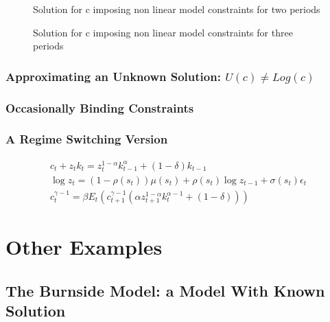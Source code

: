 \documentclass[12pt]{article}
\begin{document}
\begin{figure}
  \centering
 \caption{Solution for c imposing non linear model constraints for two periods}
  \caption{Solution for c imposing non linear model constraints for three periods}
  \label{fig:cfuncsecond}
\end{figure}

\subsubsection{Approximating an Unknown Solution: $U(c) \ne Log(c)$ }
\label{sec:recov-known-solut}



\subsubsection{Occasionally Binding Constraints}
\label{sec:recov-known-solut}


\subsubsection{A Regime Switching Version}
\label{sec:regime-switch-model}



\cite{foerster13}

\begin{gather}
c_t + z_t k_t = z_t^{1-\alpha} k_{t-1}^\alpha + (1-\delta)k_{t-1}\\
 \log z_t = (1-\rho(s_t))\mu(s_t) + \rho(s_t)\log z_{t-1}+ \sigma(s_t) \epsilon_t\\
 c_t^{\gamma-1} = \beta  
 E_t ( c_{t+1}^{\gamma-1} (\alpha z_{t+1}^{1-\alpha} k_t^{\alpha -1} + (1-\delta) ))
\end{gather}


\section{Other Examples}
\label{sec:examples}





\subsection{The Burnside Model: a Model With Known Solution}
\end{document}

